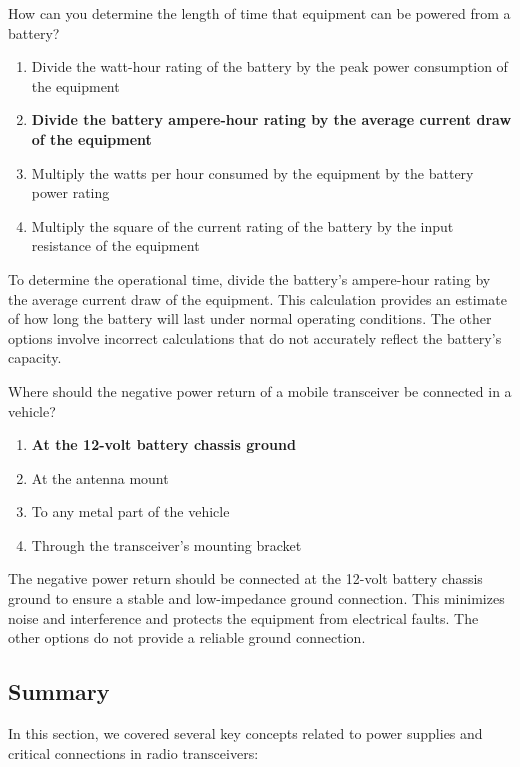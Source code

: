 \begin{tcolorbox}[colback=gray!10!white,colframe=black!75!black,title={T4A09}]
    How can you determine the length of time that equipment can be powered from a battery?
    \begin{enumerate}[label=\Alph*,noitemsep]
        \item Divide the watt-hour rating of the battery by the peak power consumption of the equipment
        \item \textbf{Divide the battery ampere-hour rating by the average current draw of the equipment}
        \item Multiply the watts per hour consumed by the equipment by the battery power rating
        \item Multiply the square of the current rating of the battery by the input resistance of the equipment
    \end{enumerate}
\end{tcolorbox}
To determine the operational time, divide the battery's ampere-hour rating by the average current draw of the equipment. This calculation provides an estimate of how long the battery will last under normal operating conditions. The other options involve incorrect calculations that do not accurately reflect the battery's capacity.


\begin{tcolorbox}[colback=gray!10!white,colframe=black!75!black,title={T4A11}]
    Where should the negative power return of a mobile transceiver be connected in a vehicle?
    \begin{enumerate}[label=\Alph*,noitemsep]
        \item \textbf{At the 12-volt battery chassis ground}
        \item At the antenna mount
        \item To any metal part of the vehicle
        \item Through the transceiver’s mounting bracket
    \end{enumerate}
\end{tcolorbox}
The negative power return should be connected at the 12-volt battery chassis ground to ensure a stable and low-impedance ground connection. This minimizes noise and interference and protects the equipment from electrical faults. The other options do not provide a reliable ground connection.


\subsection*{Summary}
In this section, we covered several key concepts related to power supplies and critical connections in radio transceivers:

